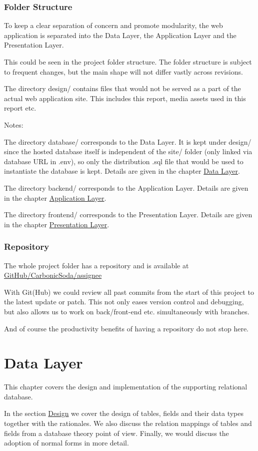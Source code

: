 \documentclass[12pt]{report}
\newcommand{\n}{\par}
\newcommand{\br}{\vspace{1 em}\n}
\begin{document}
\subsection{Folder Structure} \label{overview.project-structure.folder-structure}
To keep a clear separation of concern and promote modularity,
the web application is separated into
the Data Layer, the Application Layer and the Presentation Layer.
\br
This could be seen in the project folder structure.
The folder structure is subject to frequent changes, but the main shape will not differ vastly across revisions.
\br
{}
\vspace{2 em}
The directory design/ contains files that would not be served as a part of the actual web application site.
This includes this report, media assets used in this report etc.
\br
Notes:\n
The directory database/ corresponds to the Data Layer. It is kept under design/ since the hosted database itself is independent of the site/ folder (only linked via database URL in .env),
so only the distribution .sql file that would be used to instantiate the database is kept.
Details are given in the chapter \hyperref[data-layer]{Data Layer}.
\br
The directory backend/ corresponds to the Application Layer.
Details are given in the chapter \hyperref[application-layer]{Application Layer}.
\br
The directory frontend/ corresponds to the Presentation Layer.
Details are given in the chapter \hyperref[presentation-layer]{Presentation Layer}.
\subsection{Repository} \label{overview.project-structure.repository}
The whole project folder has a repository and is available at
\href{https://github.com/CarbonicSoda/assignee}{GitHub/Carbonic\-Soda/assignee}
\br
With Git(Hub) we could review all past commits from the start of this project to the latest update or patch.
This not only eases version control and debugging,
but also allows us to work on back/front-end etc. simultaneously with branches.
\br
And of course the productivity benefits of having a repository do not stop here.

\chapter{Data Layer} \label{data-layer}
This chapter covers the design and implementation of the supporting relational database.
\br
In the section \hyperref[data-layer.design]{Design} we cover the design of tables, fields and their data types together with the rationales.
We also discuss the relation mappings of tables and fields from a database theory point of view.
Finally, we would discuss the adoption of normal forms in more detail.
\br
\end{document}
